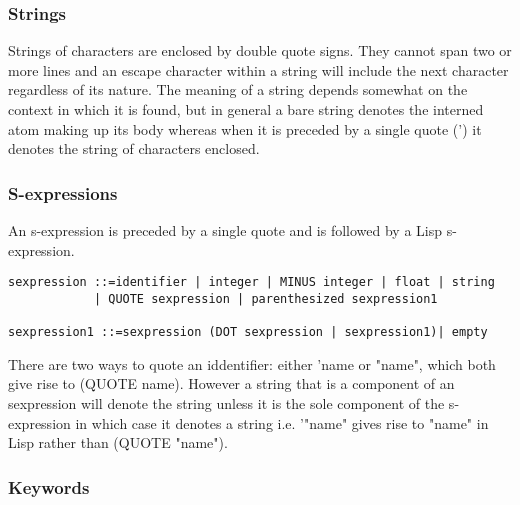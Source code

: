 \documentclass{article}
\begin{document}
\subsubsection{Strings}
\label{sec:boot:string}

Strings of characters are enclosed by double quote signs. They cannot
span two or more lines and an escape character within a string will
include the next character regardless of its nature.
The meaning of a string depends somewhat on the context in which
it is found, but in general a bare string denotes the interned atom
making up its body whereas when it is preceded by a single quote (')
it denotes the string of characters enclosed.

\subsubsection{S-expressions}
\label{sec:boot:s-expression}

An s-expression is preceded by a single quote and is followed by
a Lisp s-expression.
\begin{verbatim}
sexpression ::=identifier | integer | MINUS integer | float | string
            | QUOTE sexpression | parenthesized sexpression1

sexpression1 ::=sexpression (DOT sexpression | sexpression1)| empty
\end{verbatim}

There are two ways to quote an iddentifier: either 'name or "name", which
both give rise to (QUOTE name). However a string that is a
component of an sexpression will denote the string unless it is the
sole component of the s-expression in which case it denotes a string
i.e. '"name" gives rise to "name" in Lisp rather than (QUOTE "name").


\subsubsection{Keywords}
\label{sec:boot:keyword}
\end{document}
